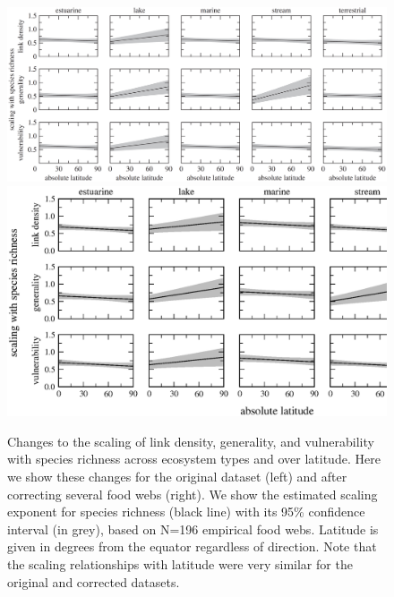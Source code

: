\documentclass[12pt]{article}
\begin{document}
\begin{spacing}{2.0}
\begin{figure}[h]
\includegraphics*[width=.48\textwidth]{Figures/Figure3.eps}
\hspace{.02\textwidth}
\includegraphics*[width=.48\textwidth]{Figures/Figure3_updated.eps}
\caption{Changes to the scaling of link density, generality, and vulnerability with species richness 
across ecosystem types and over latitude. Here we show these changes for the original dataset (left) 
and after correcting several food webs (right). We show the estimated scaling exponent for species 
richness (black line) with its 95\% confidence interval (in grey), based on N=196 empirical food 
webs. Latitude is given in degrees from the equator regardless of direction. Note that the scaling
relationships with latitude were very similar for the original and corrected datasets.} 
\label{S1} 
\end{figure}







\end{spacing}
\end{document}
